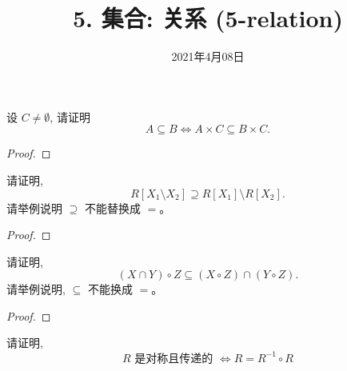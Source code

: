 \documentclass[a4paper, justified]{tufte-handout}
\title{5. 集合: 关系 (5-relation)}
\date{2021年4月08日}
\begin{document}
\maketitle
\noplagiarism %
\begin{abstract}
\end{abstract}
\beginrequired

\begin{problem}
  设 $C \neq \emptyset$, 请证明
  \[
    A \subseteq B \iff A \times C \subseteq B \times C.
  \]
\end{problem}

\begin{proof}
\end{proof}

\begin{problem}
  请证明,
  \[
    R[X_1 \setminus X_2] \supseteq R[X_1] \setminus R[X_2].
  \]
  请举例说明 $\supseteq$ 不能替换成 $=$。
\end{problem}

\begin{proof}
\end{proof}

\begin{problem}
  请证明,
  \[
    (X \cap Y) \circ Z \subseteq (X \circ Z) \cap (Y \circ Z).
  \]
  请举例说明, $\subseteq$ 不能换成 $=$。
\end{problem}

\begin{proof}
\end{proof}

\begin{problem}
  请证明,
  \[
    R \text{ 是对称且传递的 } \iff R = R^{-1} \circ R
  \]
\end{problem}
\end{document}
